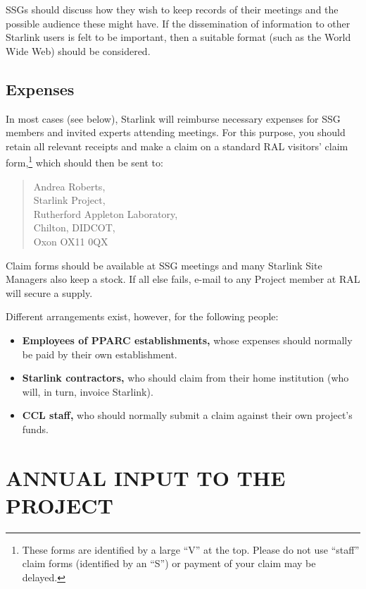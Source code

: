 \documentclass[twoside,11pt]{article}
\newcommand{\htmladdnormallink}[2]{#1}
\newcommand{\xlabel}[1]{}
\newcommand{\staffref}[1]{\htmladdnormallink{#1}{http://star-www.rl.ac.uk/pro.html}}
\newcommand{\ralref}[1]{\htmladdnormallink{#1}{http://www.clrc.ac.uk/ral/index.html}}
\newcommand{\cclref}[1]{\htmladdnormallink{#1}{http://www.clrc.ac.uk/}}
\newcommand{\qt}[1]{``#1''}
\newcommand{\qt}[1]{{\tt{"}}#1{\tt{"}}}
\begin{document}
SSGs should discuss how they wish to keep records of their meetings
and the possible audience these might have. If the dissemination of
information to other Starlink users is felt to be important, then a
suitable format (such as the World Wide Web) should be considered.

\subsection{Expenses}

In most cases (see below), Starlink will reimburse necessary expenses
for SSG members and invited experts attending meetings. For this
purpose, you should retain all relevant receipts and make a claim on a
standard \ralref{RAL} visitors' claim form,\footnote{These forms are
identified by a large \qt{V} at the top. Please do not use \qt{staff}
claim forms (identified by an \qt{S}) or payment of your claim may be
delayed.}  which should then be sent to:

\begin{quote}
Andrea Roberts,\\
Starlink Project,\\
Rutherford Appleton Laboratory,\\
Chilton, DIDCOT,\\
Oxon OX11 0QX
\end{quote}

Claim forms should be available at SSG meetings and many Starlink Site
Managers also keep a stock. If all else fails, e-mail to any
\staffref{Project member} at RAL will secure a supply.

Different arrangements exist, however, for the following people:

\begin{itemize}

\item {\bf Employees of PPARC establishments,} whose expenses should
normally be paid by their own establishment.

\item {\bf Starlink contractors,} who should claim from their home
institution (who will, in turn, invoice Starlink).

\item {\bf \cclref{CCL} staff,} who should normally submit a claim
against their own project's funds.

\end{itemize}

\section{\xlabel{annual_input}ANNUAL INPUT TO THE PROJECT}
\end{document}
